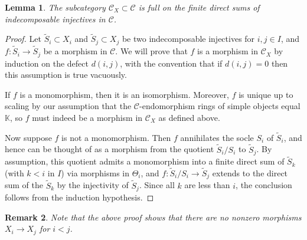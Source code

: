\documentclass[11pt]{article}
\theoremstyle{plain}
\newtheorem{lemma}{Lemma}[section]
\theoremstyle{nonumberplain}
\theoremstyle{plain}
\newtheorem{remark}[lemma]{Remark}
\theoremstyle{nonumberplain}
\newtheorem{proof}{Proof}
\newcommand\bK{{\mathbb K}}
\newcommand\cC{{\mathcal C}}
\begin{document}
\begin{lemma}\label{le.CX_full}
The subcategory $\cC_X\subset \cC$ is full on the finite direct sums of indecomposable injectives in $\cC$. 
\end{lemma}
\begin{proof}
Let $\widetilde{S}_i\subset X_i$ and $\widetilde{S}_j\subset X_j$ be two indecomposable injectives  for $i,j\in I$, and $f:\widetilde{S}_i\to \widetilde{S}_j$ be a morphism in $\cC$. We will prove that $f$ is a morphism in $\cC_X$ by induction on the defect $d(i,j)$,%
with the convention that if $d(i,j)=0$ then this assumption is true vacuously. 

If $f$ is a monomorphism, then it is an isomorphism. Moreover, $f$ is unique up to scaling by our assumption that the $\cC$-endomorphism rings of simple objects equal $\bK$, so $f$ must indeed be a morphism in $\cC_X$ as defined above.

Now suppose $f$ is not a monomorphism. Then $f$ annihilates the socle $S_i$ of $\widetilde{S}_i$, and hence can be thought of as a morphism from the quotient $\widetilde{S}_i/S_i$ to $\widetilde{S}_j$.  By assumption, this quotient admits a monomorphism into a finite direct sum of $\widetilde{S}_k$ (with $k<i$ in $I$) via morphisms in $\Theta_i$, and $f:\widetilde{S}_i/S_i\to \widetilde{S}_j$ extends to the direct sum of the $\widetilde{S}_k$ by the injectivity of $\widetilde{S}_j$. Since all $k$ are less than $i$, the conclusion follows from the induction hypothesis. 
\end{proof}




\begin{remark}
  Note that the above proof shows that there are no nonzero morphisms $X_i\to X_j$ for $i<j$. 
\end{remark}
\end{document}
